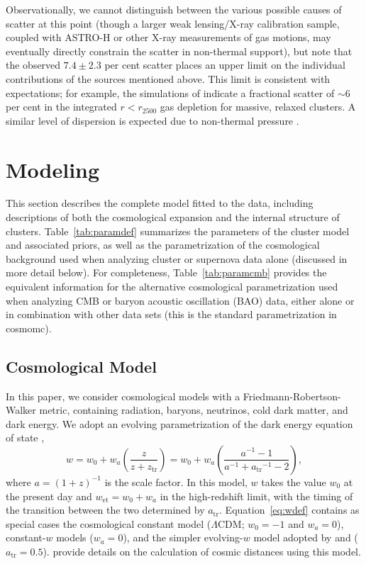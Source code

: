 \documentclass[useAMS,usenatbib,usegraphicx]{mn2e}
\newcommand*{\mysub}[2]{\ensuremath{#1_{\mathrm{#2}}}}
\newcommand*{\LCDM}{\ensuremath{\Lambda}CDM}
\newcommand*{\atr}{\mysub{a}{tr}}
\newcommand*{\wet}{\mysub{w}{et}}
\newcommand*{\eqnref}{Equation}
\newcommand*{\tabref}{Table}
\newcommand*{\arsemf}{\citetalias{Allen0706.0033}}
\begin{document}
Observationally, we cannot distinguish between the various possible causes of scatter at this point (though a larger weak lensing/X-ray calibration sample, coupled with ASTRO-H or other X-ray measurements of gas motions, may eventually directly constrain the scatter in non-thermal support), but note that the observed $7.4\pm2.3$ per cent scatter places an upper limit on the individual contributions of the sources mentioned above. This limit is consistent with expectations; for example, the simulations of \citet{Battaglia1209.4082} indicate a fractional scatter of $\sim6$ per cent in the integrated $r<r_{2500}$ gas depletion for massive, relaxed clusters. A similar level of dispersion is expected due to non-thermal pressure \citep{Nagai0609247, Rasia1201.1569, Nelson1308.6589}.










\section{Modeling} \label{sec:model}

This section describes the complete model fitted to the data, including descriptions of both the cosmological expansion and the internal structure of clusters. \tabref~\ref{tab:paramdef} summarizes the parameters of the cluster model and associated priors, as well as the parametrization of the cosmological background used when analyzing cluster or supernova data alone (discussed in more detail below). For completeness, \tabref~\ref{tab:paramcmb} provides the equivalent information for the alternative cosmological parametrization used when analyzing CMB or baryon acoustic oscillation (BAO) data, either alone or in combination with other data sets (this is the standard parametrization in {\sc cosmomc}).



\subsection{Cosmological Model} \label{sec:cosmomodel}

In this paper, we consider cosmological models with a Friedmann-Robertson-Walker metric, containing radiation, baryons, neutrinos, cold dark matter, and dark energy. We adopt an evolving parametrization of the dark energy equation of state \citep{Rapetti0409574},
\begin{equation} \label{eq:wdef}
  w = w_0 + w_a \left( \frac{z}{z+\mysub{z}{tr}} \right) = w_0 + w_a \left( \frac{a^{-1}-1}{a^{-1}+\atr^{-1}-2} \right),
\end{equation}
where $a=(1+z)^{-1}$ is the scale factor. In this model, $w$ takes the value $w_0$ at the present day and $\wet=w_0+w_a$ in the high-redshift limit, with the timing of the transition between the two determined by \atr{}. \eqnref~\ref{eq:wdef} contains as special cases the cosmological constant model (\LCDM{}; $w_0=-1$ and $w_a=0$), constant-$w$ models ($w_a=0$), and the simpler evolving-$w$ model adopted by \citet{Chevallier0009008} and \citet{Linder0208512} ($\atr=0.5$). \arsemf{} provide details on the calculation of cosmic distances using this model.
\end{document}
